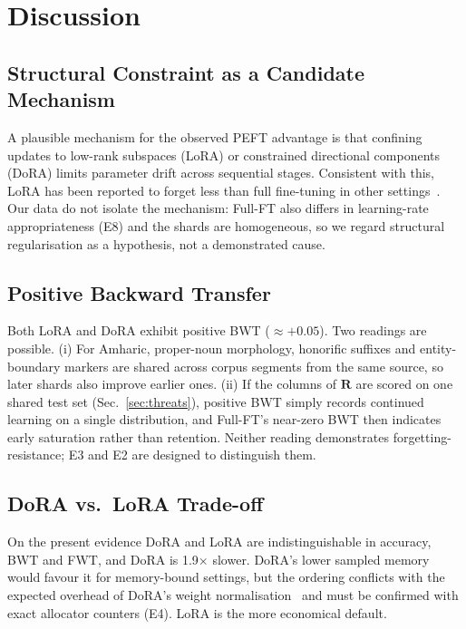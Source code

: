 \documentclass[11pt,a4paper]{article}
\begin{document}
\section{Discussion}
\label{sec:discussion}

\subsection{Structural Constraint as a Candidate Mechanism}

A plausible mechanism for the observed PEFT advantage is that confining
updates to low-rank subspaces (LoRA) or constrained directional
components (DoRA) limits parameter drift across sequential stages.
Consistent with this, LoRA has been reported to forget less than full
fine-tuning in other settings~\cite{Biderman2024,Luo2023}.  Our data do
not isolate the mechanism: Full-FT also differs in learning-rate
appropriateness (E8) and the shards are homogeneous, so we regard
structural regularisation as a hypothesis, not a demonstrated cause.

\subsection{Positive Backward Transfer}

Both LoRA and DoRA exhibit positive BWT ($\approx+0.05$).  Two
readings are possible.  (i) For Amharic, proper-noun morphology,
honorific suffixes and entity-boundary markers are shared across
corpus segments from the same source, so later shards also improve
earlier ones.  (ii) If the columns of $\mathbf{R}$ are scored on one
shared test set (Sec.~\ref{sec:threats}), positive BWT simply records
continued learning on a single distribution, and Full-FT's near-zero
BWT then indicates early saturation rather than retention.  Neither
reading demonstrates forgetting-resistance; E3 and E2 are designed to
distinguish them.

\subsection{DoRA vs.\ LoRA Trade-off}

On the present evidence DoRA and LoRA are indistinguishable in
accuracy, BWT and FWT, and DoRA is 1.9$\times$ slower.  DoRA's lower
sampled memory would favour it for memory-bound settings, but the
ordering conflicts with the expected overhead of DoRA's weight
normalisation~\cite{Liu2024DoRA} and must be confirmed with exact
allocator counters (E4).  LoRA is the more economical default.
\end{document}

